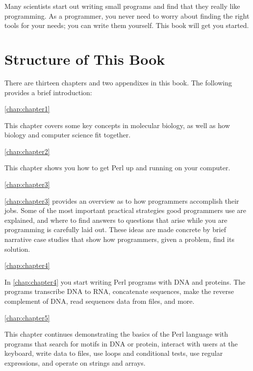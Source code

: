 Many scientists start out writing small programs and find that they really like programming. As a programmer, you never need to worry about finding the right tools for your needs; you can write them yourself. This book will get you started. 

\section*{Structure of This Book}
There are thirteen chapters and two appendixes in this book. The following provides a brief introduction:

\autoref{chap:chapter1}
\begin{adjustwidth}{1cm}{0cm}
This chapter covers some key concepts in molecular biology, as well as how biology and computer science fit together.
\end{adjustwidth}

\autoref{chap:chapter2}
\begin{adjustwidth}{1cm}{0cm}
This chapter shows you how to get Perl up and running on your computer.
\end{adjustwidth}

\autoref{chap:chapter3}
\begin{adjustwidth}{1cm}{0cm}
\autoref{chap:chapter3} provides an overview as to how programmers accomplish their jobs. Some of the most important practical strategies good programmers use are explained, and where to find answers to questions that arise while you are programming is carefully laid out. These ideas are made concrete by brief narrative case studies that show how programmers, given a problem, find its solution.
\end{adjustwidth}

\autoref{chap:chapter4}
\begin{adjustwidth}{1cm}{0cm}
In \autoref{chap:chapter4} you start writing Perl programs with DNA and proteins. The programs transcribe DNA to RNA, concatenate sequences, make the reverse complement of DNA, read sequences data from files, and more.
\end{adjustwidth}

\autoref{chap:chapter5}
\begin{adjustwidth}{1cm}{0cm}
This chapter continues demonstrating the basics of the Perl language with programs that search for motifs in DNA or protein, interact with users at the keyboard, write data to files, use loops and conditional tests, use regular expressions, and operate on strings and arrays.
\end{adjustwidth}

